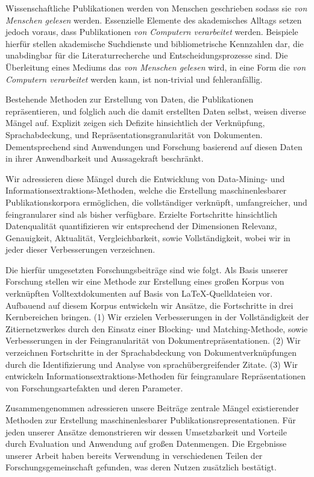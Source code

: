 \Abstract[Zusammenfassung]{}
Wissenschaftliche Publikationen werden von Menschen geschrieben sodass sie \emph{von Menschen gelesen} werden.
Essenzielle Elemente des akademisches Alltags setzen jedoch voraus, dass Publikationen \emph{von Computern verarbeitet} werden.
Beispiele hierfür stellen akademische Suchdienste und bibliometrische Kennzahlen dar, die unabdingbar für die Literaturrecherche und Entscheidungsprozesse sind.
Die Überleitung eines Mediums das \emph{von Menschen gelesen} wird, in eine Form die \emph{von Computern verarbeitet} werden kann, ist non-trivial und fehleranfällig.

Bestehende Methoden zur Erstellung von Daten, die Publikationen repräsentieren, und folglich auch die damit erstellten Daten selbst, weisen diverse Mängel auf. Explizit zeigen sich Defizite hinsichtlich der Verknüpfung, Sprachabdeckung, und Repräsentationsgranularität von Dokumenten. Dementsprechend sind Anwendungen und Forschung basierend auf diesen Daten in ihrer Anwendbarkeit und Aussagekraft beschränkt.

Wir adressieren diese Mängel durch die Entwicklung von Data-Mining- und In\-for\-ma\-tions\-ex\-trak\-tions-Methoden, welche die Erstellung maschinenlesbarer Publikationskorpora ermöglichen, die vollständiger verknüpft, umfangreicher, und feingranularer sind als bisher verfügbare. Erzielte Fortschritte hinsichtlich Datenqualität quantifizieren wir entsprechend der Dimensionen Relevanz, Genauigkeit, Aktualität, Vergleichbarkeit, sowie Vollständigkeit, wobei wir in jeder dieser Verbesserungen verzeichnen.

Die hierfür umgesetzten Forschungsbeiträge sind wie folgt.
Als Basis unserer Forschung stellen wir eine Methode zur Erstellung eines großen Korpus von verknüpften Volltextdokumenten auf Basis von \LaTeX-Quelldateien vor.
Aufbauend auf diesem Korpus entwickeln wir Ansätze, die Fortschritte in drei Kernbereichen bringen.
(1) Wir erzielen Verbesserungen in der Vollständigkeit der Zitiernetzwerkes durch den Einsatz einer Blocking- und Matching-Methode, sowie Verbesserungen in der Feingranularität von Dokumentrepräsentationen.
(2) Wir verzeichnen Fortschritte in der Sprachabdeckung von Dokumentverknüpfungen durch die Identifizierung und Analyse von sprachübergreifender Zitate.
(3) Wir entwickeln In\-for\-ma\-tions\-ex\-trak\-tions-Methoden für feingranulare Repräsentationen von Forschungsartefakten und deren Parameter.

Zusammengenommen adressieren unsere Beiträge zentrale Mängel existierender Methoden zur Erstellung maschinenlesbarer Publikationsrepresentationen.
Für jeden unserer Ansätze demonstrieren wir dessen Umsetzbarkeit und Vorteile durch Evaluation und Anwendung auf großen Datenmengen.
Die Ergebnisse unserer Arbeit haben bereits Verwendung in verschiedenen Teilen der Forschungsgemeinschaft gefunden, was deren Nutzen zusätzlich bestätigt.
